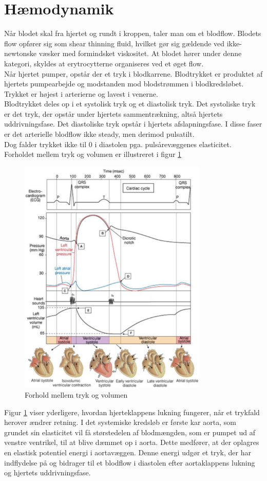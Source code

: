 \section{Hæmodynamik}
Når blodet skal fra hjertet og rundt i kroppen, taler man om et blodflow. Blodets flow opfører sig som shear thinning fluid, hvilket gør sig gældende ved ikke-newtonske væsker med formindsket viskositet. At blodet hører under denne kategori, skyldes at erytrocytterne  organiseres ved et øget flow. \\
Når hjertet pumper, opstår der et tryk i blodkarrene. Blodtrykket er produktet af hjertets pumpearbejde og modstanden mod blodstrømmen i blodkredsløbet. Trykket er højest i arterierne og lavest i venerne.\cite{haemo}\\
Blodtrykket deles op i et systolisk tryk og et diastolisk tryk. Det systoliske tryk er det tryk, der opstår under hjertets sammentrækning, altså hjertets uddrivningsfase. Det diastoliske tryk opstår i hjertets afslapningsfase. I disse faser er det arterielle blodflow ikke steady, men derimod pulsatilt. 
\\Dog falder trykket ikke til 0 i diastolen pga. pulsårevæggenes elasticitet. Forholdet mellem tryk og volumen er illustreret i figur \ref{tryk og volumen}
\begin{figure}[H]
	\centering
	\includegraphics[width=0.8\textwidth]{Figurer/Fysio/TrykOgVolumen}
	\caption{Forhold mellem tryk og volumen\protect\cite{tryk}}
	\label{tryk og volumen}
\end{figure}
Figur \ref{tryk og volumen} viser yderligere, hvordan hjerteklappens lukning fungerer, når et trykfald herover ændrer retning. I det systemiske kredsløb er første kar aorta, som grundet sin elasticitet vil få størstedelen af blodmængden, som er pumpet ud af venstre ventrikel, til at blive dæmmet op i aorta. Dette medfører, at der oplagres en elastisk potentiel energi i aortavæggen. Denne energi udgør et tryk, der har indflydelse på og bidrager til et blodflow i diastolen efter aortaklappens lukning og hjertets uddrivningsfase. 

